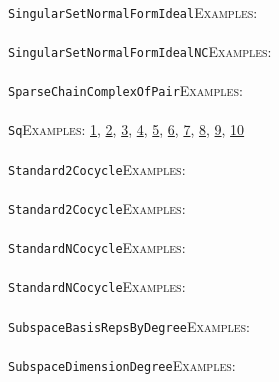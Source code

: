 \documentclass[a4paper,11pt]{report}
\begin{document}
{{ \\
 \texttt{SingularSetNormalFormIdeal}{\nobreakspace}{\nobreakspace}{\nobreakspace}{\nobreakspace}\textsc{Examples:} \\
 \\
 \texttt{SingularSetNormalFormIdealNC}{\nobreakspace}{\nobreakspace}{\nobreakspace}{\nobreakspace}\textsc{Examples:} \\
 \\
 \texttt{SparseChainComplexOfPair}{\nobreakspace}{\nobreakspace}{\nobreakspace}{\nobreakspace}\textsc{Examples:} \\
 \\
 \texttt{Sq}{\nobreakspace}{\nobreakspace}{\nobreakspace}{\nobreakspace}\textsc{Examples:} \href{tutorial/chap7.html} {1}{\nobreakspace}, \href{tutorial/chap10.html} {2}{\nobreakspace}, \href{../www/SideLinks/About/aboutArtinGroups.html} {3}{\nobreakspace}, \href{../www/SideLinks/About/aboutModPRings.html} {4}{\nobreakspace}, \href{../www/SideLinks/About/aboutAspherical.html} {5}{\nobreakspace}, \href{../www/SideLinks/About/aboutNonabelian.html} {6}{\nobreakspace}, \href{../www/SideLinks/About/aboutQuandles2.html} {7}{\nobreakspace}, \href{../www/SideLinks/About/aboutKnots.html} {8}{\nobreakspace}, \href{../www/SideLinks/About/aboutTensorSquare.html} {9}{\nobreakspace}, \href{../www/SideLinks/About/aboutKnotsQuandles.html} {10}{\nobreakspace} \\
 \\
 \texttt{Standard2Cocycle}{\nobreakspace}{\nobreakspace}{\nobreakspace}{\nobreakspace}\textsc{Examples:} \\
 \\
 \texttt{Standard2Cocycle}{\nobreakspace}{\nobreakspace}{\nobreakspace}{\nobreakspace}\textsc{Examples:} \\
 \\
 \texttt{StandardNCocycle}{\nobreakspace}{\nobreakspace}{\nobreakspace}{\nobreakspace}\textsc{Examples:} \\
 \\
 \texttt{StandardNCocycle}{\nobreakspace}{\nobreakspace}{\nobreakspace}{\nobreakspace}\textsc{Examples:} \\
 \\
 \texttt{SubspaceBasisRepsByDegree}{\nobreakspace}{\nobreakspace}{\nobreakspace}{\nobreakspace}\textsc{Examples:} \\
 \\
 \texttt{SubspaceDimensionDegree}{\nobreakspace}{\nobreakspace}{\nobreakspace}{\nobreakspace}\textsc{Examples:} \\
}}
\end{document}
